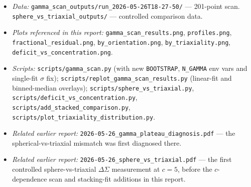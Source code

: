 \documentclass[11pt,a4paper]{article}
\newcommand{\DS}{\Delta\Sigma}
\begin{document}
\begin{itemize}
\item \emph{Data:}
  \texttt{gamma\_scan\_outputs/run\_2026-05-26T18-27-50/} --- 201-point scan.\\
  \texttt{sphere\_vs\_triaxial\_outputs/} --- controlled comparison data.
\item \emph{Plots referenced in this report:}
  \texttt{gamma\_scan\_results.png},
  \texttt{profiles.png},
  \texttt{fractional\_residual.png},
  \texttt{by\_orientation.png},
  \texttt{by\_triaxiality.png},
  \texttt{deficit\_vs\_concentration.png}.
\item \emph{Scripts:}
  \texttt{scripts/gamma\_scan.py} (with new \texttt{BOOTSTRAP},
  \texttt{N\_GAMMA} env vars and single-fit $\sigma$ fix);
  \texttt{scripts/replot\_gamma\_scan\_results.py} (linear-fit and
  binned-median overlays);
  \texttt{scripts/sphere\_vs\_triaxial.py},
  \texttt{scripts/deficit\_vs\_concentration.py},
  \texttt{scripts/add\_stacked\_comparison.py},
  \texttt{scripts/plot\_triaxiality\_distribution.py}.
\item \emph{Related earlier report:}
  \texttt{2026-05-26\_gamma\_plateau\_diagnosis.pdf} --- the
  spherical-vs-triaxial mismatch was first diagnosed there.
\item \emph{Related earlier report:}
  \texttt{2026-05-26\_sphere\_vs\_triaxial.pdf} --- the first controlled
  sphere-vs-triaxial $\DS$ measurement at $c=5$, before the $c$-dependence
  scan and stacking-fit additions in this report.
\end{itemize}
\end{document}
